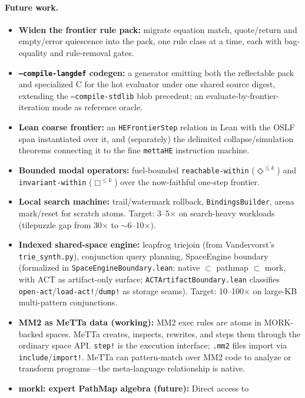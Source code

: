 \documentclass[11pt]{article}
\newcommand{\code}[1]{\texttt{#1}}
\newcommand{\PathMap}{\textup{PathMap}}
\begin{document}
\paragraph{Future work.}
\begin{itemize}
\item \textbf{Widen the frontier rule pack:} migrate equation match,
  quote/return and empty/error quiescence into the pack, one rule
  class at a time, each with bag-equality and rule-removal gates.
\item \textbf{\code{--compile-langdef} codegen:} a generator emitting
  both the reflectable pack and specialized C for the hot evaluator
  under one shared source digest, extending the
  \code{--compile-stdlib} blob precedent; an
  evaluate-by-frontier-iteration mode as reference oracle.
\item \textbf{Lean coarse frontier:} an \code{HEFrontierStep} relation
  in Lean with the OSLF span instantiated over it, and (separately) the
  delimited collapse/simulation theorems connecting it to the fine
  \code{mettaHE} instruction machine.
\item \textbf{Bounded modal operators:} fuel-bounded
  \code{reachable-within} ($\Diamond^{\le k}$) and
  \code{invariant-within} ($\Box^{\le k}$) over the now-faithful
  one-step frontier.
\item \textbf{Local search machine:} trail/watermark rollback,
  \code{BindingsBuilder}, arena mark/reset for scratch atoms.
  Target: 3--5$\times$ on search-heavy workloads (tilepuzzle gap
  from 30$\times$ to $\sim$6--10$\times$).
\item \textbf{Indexed shared-space engine:} leapfrog triejoin
  (from Vandervorst's \code{trie\_synth.py}), conjunction query
  planning, SpaceEngine boundary (formalized in
  \code{SpaceEngineBoundary.lean}: native $\subset$ pathmap $\subset$ mork,
  with ACT as artifact-only surface; \code{ACTArtifactBoundary.lean}
  classifies \code{open-act}/\code{load-act!}/\code{dump!} as storage seams).
  Target: 10--100$\times$ on large-KB multi-pattern conjunctions.
\item \textbf{MM2 as MeTTa data (working):} MM2 exec rules are atoms in
  MORK-backed spaces.  MeTTa creates, inspects, rewrites, and steps them
  through the ordinary space API\@.  \code{step!} is the execution interface;
  \code{.mm2} files import via \code{include}/\code{import!}.  MeTTa can
  pattern-match over MM2 code to analyze or transform programs---the
  meta-language relationship is native.
\item \textbf{morkl: expert \PathMap{} algebra (future):}  Direct access to

\end{itemize}
\end{document}
